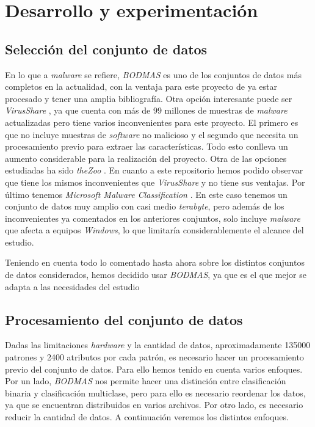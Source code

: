 \chapter{Desarrollo y experimentación}
\label{ch:desarrollo}

\section{Selección del conjunto de datos}
\label{sec:select_dataset}

En lo que a \textit{malware} se refiere, \textit{BODMAS} \cite{bodmas} es uno de los conjuntos de datos más completos en la actualidad, con la ventaja para este proyecto de ya estar procesado y tener una amplia bibliografía. Otra opción interesante puede ser \textit{VirusShare} \cite{virusshare}, ya que cuenta con más de 99 millones de muestras de \textit{malware} actualizadas pero tiene varios inconvenientes para este proyecto. El primero es que no incluye muestras de \textit{software} no malicioso y el segundo que necesita un procesamiento previo para extraer las características. Todo esto conlleva un aumento considerable para la realización del proyecto. Otra de las opciones estudiadas ha sido \textit{theZoo} \cite{thezoo}. En cuanto a este repositorio hemos podido observar que tiene los mismos inconvenientes que \textit{VirusShare} y no tiene sus ventajas. Por último tenemos \textit{Microsoft Malware Classification} \cite{malware-classification}. En este caso tenemos un conjunto de datos muy amplio con casi medio \textit{terabyte}, pero además de los inconvenientes ya comentados en los anteriores conjuntos, solo incluye \textit{malware} que afecta a equipos \textit{Windows}, lo que limitaría considerablemente el alcance del estudio.

\vspace{1em}

Teniendo en cuenta todo lo comentado hasta ahora sobre los distintos conjuntos de datos considerados, hemos decidido usar \textit{BODMAS}, ya que es el que mejor se adapta a las necesidades del estudio

\newpage
\section{Procesamiento del conjunto de datos}
\label{sec:proc_dataset}

Dadas las limitaciones \textit{hardware} y la cantidad de datos, aproximadamente 135000 patrones y 2400 atributos por cada patrón, es necesario hacer un procesamiento previo del conjunto de datos. Para ello hemos tenido en cuenta varios enfoques. Por un lado, \textit{BODMAS} nos permite hacer una distinción entre clasificación binaria y clasificación multiclase, pero para ello es necesario reordenar los datos, ya que se encuentran distribuidos en varios archivos. Por otro lado, es necesario reducir la cantidad de datos. A continuación veremos los distintos enfoques.

